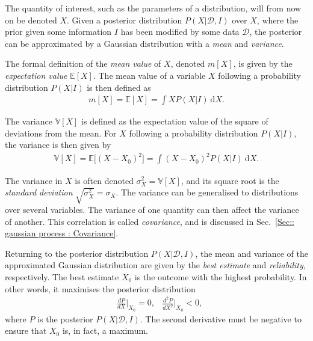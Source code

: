 \documentclass[twoside,english]{uiofysmaster}
\begin{document}
{{The quantity of interest, such as the parameters of a distribution, will from now on be denoted $X$. Given a posterior distribution $P(X| \mathcal{D}, I)$ over $X$, where the prior given some information $I$ has been modified by some data $\mathcal{D}$, the posterior can be approximated by a Gaussian distribution with a \textit{mean} and \textit{variance}. 

The formal definition of the \textit{mean value} of $X$, denoted $m[X]$, is given by the \textit{expectation value} $\mathbb{E}[X]$. The mean value of a variable $X$ following a probability distribution $P(X |  I)$ is then defined as
\begin{align}\label{Eq:: gaussian process : Expectation value}
m[X] = \mathbb{E}[X] = \int X P(X | I) ~\text{d}X .
\end{align}

The variance $\mathbb{V} [X]$ is defined as the expectation value of the square of deviations from the mean. For $X$ following a probability distribution $P(X | I)$, the variance is then given by 
\begin{align}\label{Eq:: gaussian process : variance X 1dim}
\mathbb{V}[X] = \mathbb{E} \big[ (X - X_0)^2 \big] = \int  (X - X_0)^2 P (X| I) ~\text{d}X.
\end{align}

The variance in $X$ is often denoted $\sigma_X^2 = \mathbb{V}[X]$, and its square root is the \textit{standard deviation} $\sqrt{\sigma^2_X} = \sigma_X$. The variance can be generalised to distributions over several variables. The variance of one quantity can then affect the variance of another. This correlation is called \textit{covariance}, and is discussed in Sec.~\ref{Sec:: gaussian process : Covariance}.

Returning to the posterior distribution $P(X | \mathcal{D}, I)$, the mean and variance of the approximated Gaussian distribution are given by the \textit{best estimate} and \textit{reliability}, respectively. The best estimate $X_0$  is the outcome with the highest probability. In other words, it maximises the posterior distribution
\begin{align}\label{Eq:: gaussian process : max of posterior}
&\frac{dP}{dX}\Big|_{X_0} = 0, &\frac{d^2P}{dX^2}\Big|_{X_0} < 0,
\end{align}
where $P$ is the posterior $P(X| \mathcal{D}, I)$. The second derivative must be negative to ensure that $X_0$ is, in fact, a maximum. 

}}
\end{document}
